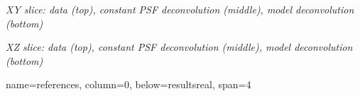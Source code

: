 \documentclass[a0paper,portrait,fontscale=0.35]{baposter}
\newcommand{\mycaption}[1]{
  {
    \smaller
    \emph{#1}
  }
}
\theoremstyle{plain}
\theoremstyle{plain}
\theoremstyle{definition}
\theoremstyle{plain}
\theoremstyle{definition}
\begin{document}
\begin{poster}
{\begin{minipage}[t]{0.48\textwidth}
\begin{minipage}[t]{0.49\textwidth}
      \vspace{-1em}
      \begin{center}
        \mycaption{
          XY slice: data (top), constant PSF deconvolution (middle),
          model deconvolution (bottom)
        }
      \end{center}

      \vspace{-0.8em}
      \centering

      \vspace{-1em}
      \begin{center}
        \mycaption{
          XZ slice: data (top), constant PSF deconvolution (middle),
          model deconvolution (bottom)
        }
      \end{center}
    \end{minipage}
  \end{minipage}
  \vspace{-1em}
}

{name=references, column=0,  below=resultsreal, span=4}
{
  \tiny
  \renewcommand{\section}[2]{\vspace{0.01em}}	%
  
}


\end{poster}
\end{document}
